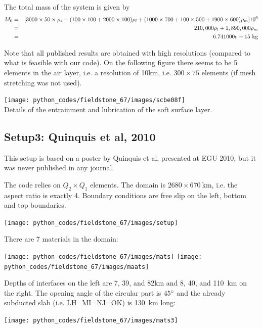 The total mass of the system is given by
\begin{eqnarray}
M_0 &=& [3000\times 50\times \rho_s + (100\times 100+ 2000\times 100)\rho_l + 
(1000\times 700 + 100\times 500 + 1900\times 600)\rho_m] 10^6\nn\\
&=&210,000 \rho_l + 1,890,000 \rho_m \nn\\
&=&6.741000e+15~\si{\kg}
\end{eqnarray}

Note that all published results are obtained with high resolutions (compared to what is 
feasible with our code). On the following figure there seems to be 5 elements in the air layer, 
i.e. a resolution of 10km, i.e. $300\times 75$ elements (if mesh stretching was not used).
\begin{center}
\texttt{[image: python\_codes/fieldstone\_67/images/scbe08f]}\\
{\captionfont Details of the entrainment and lubrication of the soft surface layer.}
\end{center}

\subsection*{Setup3: Quinquis et al, 2010}

This setup is based on a poster by Quinquis et al, presented at EGU 2010, but it
was never published in any journal.

The code relies on $Q_2\times Q_1$ elements. 
The domain is $2680\times 670~\si{\km}$, i.e. the aspect ratio is exactly 4.
Boundary conditions are free slip on the left, bottom and top boundaries. 

\begin{center}
\texttt{[image: python\_codes/fieldstone\_67/images/setup]}
\end{center}

There are 7 materials in the domain:
\begin{center}
\texttt{[image: python\_codes/fieldstone\_67/images/mats]}
\texttt{[image: python\_codes/fieldstone\_67/images/maats]}
\end{center}

Depths of interfaces on the left are 7, 39, and 82\si{\km} and 
8, 40, and 110~\si{\km} on the right.
The opening angle of the circular part is $45\degree$ and the 
already subducted slab (i.e. LH=MI=NJ=OK) is 130~\si{\km} long:

\begin{center}
\texttt{[image: python\_codes/fieldstone\_67/images/mats3]}
\end{center}

